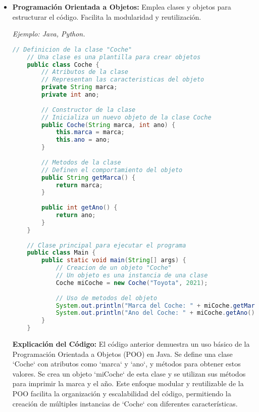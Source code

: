 \documentclass{report}
\begin{document}
\begin{itemize}
\item \textbf{Programación Orientada a Objetos:} Emplea clases y objetos para estructurar el código. Facilita la modularidad y reutilización. 

\textit{Ejemplo: Java, Python.}

\begin{minipage}{\linewidth}
    \begin{lstlisting}[language=Java, caption=Ejemplo de POO en Java]
    // Definicion de la clase "Coche"
    // Una clase es una plantilla para crear objetos
    public class Coche {
        // Atributos de la clase
        // Representan las caracteristicas del objeto
        private String marca;
        private int ano;
    
        // Constructor de la clase
        // Inicializa un nuevo objeto de la clase Coche
        public Coche(String marca, int ano) {
            this.marca = marca;
            this.ano = ano;
        }
    
        // Metodos de la clase
        // Definen el comportamiento del objeto
        public String getMarca() {
            return marca;
        }
    
        public int getAno() {
            return ano;
        }
    }
    
    // Clase principal para ejecutar el programa
    public class Main {
        public static void main(String[] args) {
            // Creacion de un objeto "Coche"
            // Un objeto es una instancia de una clase
            Coche miCoche = new Coche("Toyota", 2021);
    
            // Uso de metodos del objeto
            System.out.println("Marca del Coche: " + miCoche.getMarca());
            System.out.println("Ano del Coche: " + miCoche.getAno());
        }
    }
    \end{lstlisting}
    \end{minipage}

    \textbf{Explicación del Código:}
    El código anterior demuestra un uso básico de la Programación Orientada a Objetos (POO) en Java. Se define una clase `Coche` con atributos como `marca` y `ano`, y métodos para obtener estos valores. Se crea un objeto `miCoche` de esta clase y se utilizan sus métodos para imprimir la marca y el año. Este enfoque modular y reutilizable de la POO facilita la organización y escalabilidad del código, permitiendo la creación de múltiples instancias de `Coche` con diferentes características.
    

\end{itemize}
\end{document}
